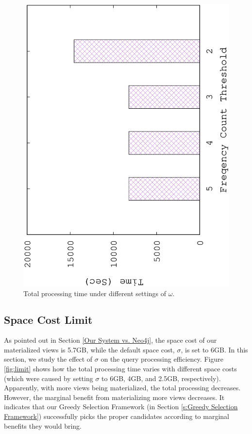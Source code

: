 	\begin{figure}[H]
		\centering
		\includegraphics[scale=0.5, angle=270]{plot/omega.eps}
		\caption{Total processing time under different settings of $\omega$.}
		\label{fig:omega}
	\end{figure}
	
	
	\subsection{Space Cost Limit}
	\label{Space Cost Limit}
	As pointed out in Section \ref{Our System vs. Neo4j}, the space cost of our materialized views is 5.7GB, while the default space cost, $\sigma$, is set to 6GB. In this section, we study the effect of $\sigma$ on the query processing efficiency.  Figure \ref{fig:limit} shows how the total processing time varies with different space costs (which were caused by setting $\sigma$ to 6GB, 4GB, and 2.5GB, respectively). Apparently,  with more views being materialized, the total processing decreases. However, the marginal benefit from materializing more views decreases. It indicates that our Greedy Selection Framework (in Section \ref{s:Greedy Selection Framework}) successfully picks the proper candidates according to marginal benefits they would bring.
	
